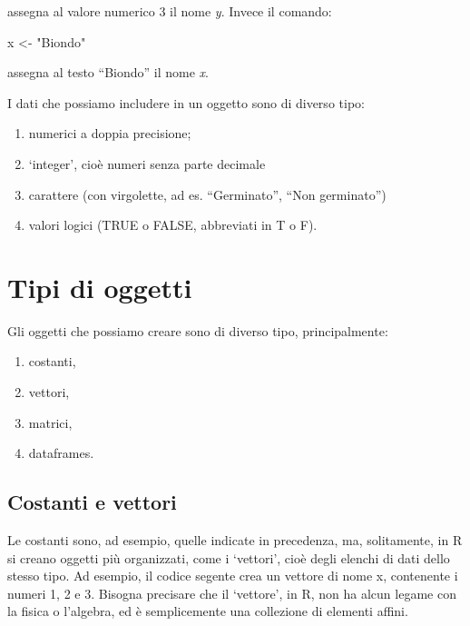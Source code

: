 \documentclass[
  12pt,
]{book}
\newenvironment{Shaded}{\begin{snugshade}}{\end{snugshade}}
\newcommand{\NormalTok}[1]{#1}
\newcommand{\OtherTok}[1]{\textcolor[rgb]{0.56,0.35,0.01}{#1}}
\newcommand{\StringTok}[1]{\textcolor[rgb]{0.31,0.60,0.02}{#1}}
\providecommand{\tightlist}{%
  \setlength{\itemsep}{0pt}\setlength{\parskip}{0pt}}
\begin{document}
assegna al valore numerico 3 il nome \emph{y}. Invece il comando:

\begin{Shaded}
\begin{Highlighting}[]
\NormalTok{x  }\OtherTok{\textless{}{-}}  \StringTok{"Biondo"}
\end{Highlighting}
\end{Shaded}

assegna al testo ``Biondo'' il nome \emph{x}.

I dati che possiamo includere in un oggetto sono di diverso tipo:

\begin{enumerate}
\def\labelenumi{\arabic{enumi}.}
\tightlist
\item
  numerici a doppia precisione;
\item
  `integer', cioè numeri senza parte decimale
\item
  carattere (con virgolette, ad es. ``Germinato'', ``Non germinato'')
\item
  valori logici (TRUE o FALSE, abbreviati in T o F).
\end{enumerate}

\hypertarget{tipi-di-oggetti}{%
\section{Tipi di oggetti}\label{tipi-di-oggetti}}

Gli oggetti che possiamo creare sono di diverso tipo, principalmente:

\begin{enumerate}
\def\labelenumi{\arabic{enumi}.}
\tightlist
\item
  costanti,
\item
  vettori,
\item
  matrici,
\item
  dataframes.
\end{enumerate}

\hypertarget{costanti-e-vettori}{%
\subsection{Costanti e vettori}\label{costanti-e-vettori}}

Le costanti sono, ad esempio, quelle indicate in precedenza, ma, solitamente, in R si creano oggetti più organizzati, come i `vettori', cioè degli elenchi di dati dello stesso tipo. Ad esempio, il codice segente crea un vettore di nome x, contenente i numeri 1, 2 e 3. Bisogna precisare che il `vettore', in R, non ha alcun legame con la fisica o l'algebra, ed è semplicemente una collezione di elementi affini.
\end{document}
